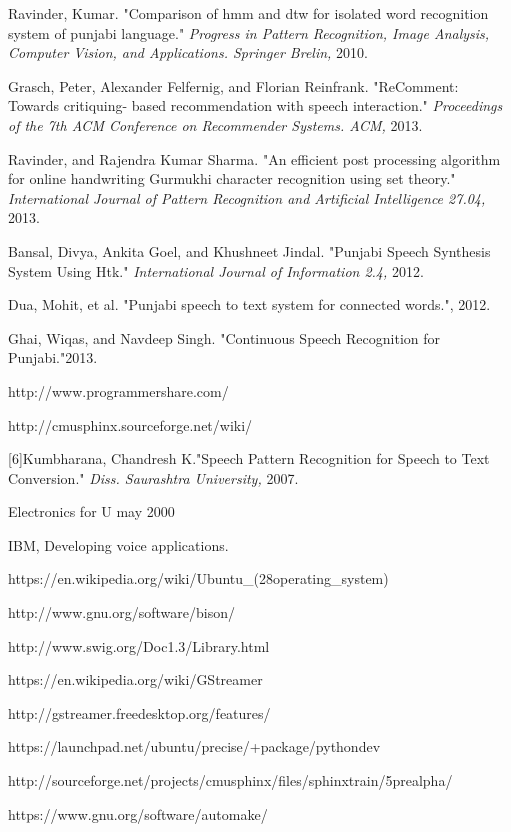 \documentclass[12pt,a4paper,oneside]{memoir}
\begin{document}
\begin{thebibliography}{9}
 Ravinder, Kumar. "Comparison of hmm and dtw for isolated word recognition system of punjabi language."
\textit{Progress in Pattern Recognition, Image Analysis, Computer Vision, and Applications. Springer Brelin,} 2010.

Grasch, Peter, Alexander Felfernig, and Florian Reinfrank. "ReComment: Towards critiquing-
based recommendation with speech interaction."
\textit{Proceedings of the 7th ACM Conference on Recommender Systems. ACM,} 2013.

Ravinder, and Rajendra Kumar Sharma. "An efficient post processing algorithm for online handwriting Gurmukhi character recognition using set theory."
\textit{International Journal of Pattern Recognition and Artificial Intelligence 27.04,} 2013.

Bansal, Divya, Ankita Goel, and Khushneet Jindal. "Punjabi Speech Synthesis System Using Htk."
\textit{International Journal of Information 2.4,} 2012.

Dua, Mohit, et al. "Punjabi speech to text system for connected words.", 2012.
\textit{}

Ghai, Wiqas, and Navdeep Singh. "Continuous Speech Recognition for Punjabi."2013.
\textit{}

http://www.programmershare.com/

http://cmusphinx.sourceforge.net/wiki/

[6]Kumbharana, Chandresh K."Speech Pattern Recognition for Speech to Text Conversion."
\textit{Diss. Saurashtra University,} 2007.

 Electronics for U may 2000

IBM, Developing voice applications.

 https://en.wikipedia.org/wiki/Ubuntu\_(28operating\_system)
\textit{}

http://www.gnu.org/software/bison/
\textit{}

http://www.swig.org/Doc1.3/Library.html
\textit{}

https://en.wikipedia.org/wiki/GStreamer
\textit{}

http://gstreamer.freedesktop.org/features/
\textit{}

https://launchpad.net/ubuntu/precise/+package/pythondev
\textit{}

http://sourceforge.net/projects/cmusphinx/files/sphinxtrain/5prealpha/
\textit{}

https://www.gnu.org/software/automake/
\textit{}



\end{thebibliography}
\end{document}
